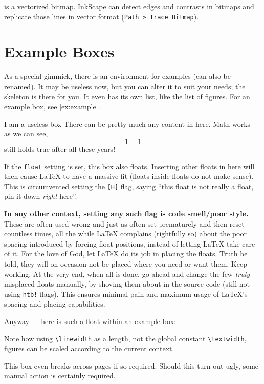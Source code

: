  is a vectorized bitmap.
InkScape can detect edges and contrasts in bitmaps and replicate those lines in
vector format (\texttt{Path > Trace Bitmap}).

\section{Example Boxes}

As a special gimmick, there is an environment for examples (can also be renamed).
It may be useless now, but you can alter it to suit your needs; the skeleton is
there for you.
It even has its own list, like the list of figures.
For an example box, see \cref{ex:example}.

\begin{example}[%
        label={ex:example},%
    ]{%
        I am a useless box%
    }
    There can be pretty much any content in here.
    Math works --- as we can see,
    \begin{equation}
        1 = 1
    \end{equation}
    still holds true after all these years!
    
    If the \verb|float| setting is set, this box also floats.
    Inserting other floats in here will then cause \LaTeX{} to have a massive fit
    (floats inside floats do not make sense).
    This is circumvented setting the \verb|[H]| flag,
    saying \enquote{this float is not really a float, pin it down \emph{right} here}.
    
    \textbf{In any other context, setting any such flag is code smell/poor style.}
    These are often used wrong and just as often set prematurely and then reset
    countless times, all the while \LaTeX{} complains (rightfully so) about the poor
    spacing introduced by forcing float positions, instead of letting \LaTeX{} take
    care of it.
    For the love of God, let \LaTeX{} do its job in placing the floats.
    Truth be told, they will on occasion not be placed where you need or want them.
    Keep working.
    At the very end, when all is done, go ahead and change the few \emph{truly}
    misplaced floats manually, by shoving them about in the source code
    (still not using \verb|htb!| flags).
    This ensures minimal pain and maximum usage of \LaTeX{}'s spacing and placing
    capabilities.
    
    Anyway --- here is such a float within an example box:
    \begin{figure}[H]
    \end{figure}
    Note how using \verb|\linewidth| as a length, not the global constant
    \verb|\textwidth|, figures can be scaled according to the current context.
    
    This box even breaks across pages if so required.
    Should this turn out ugly, some manual action is certainly required.
\end{example}
